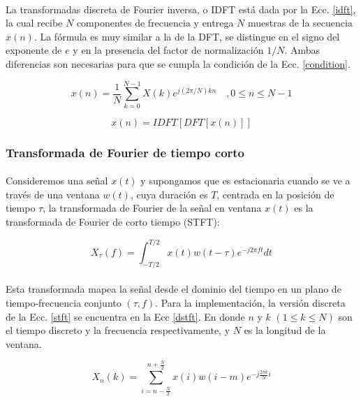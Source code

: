 \documentclass[a4paper,12pt]{article}
\begin{document}
\paragraph{}
La transformadas discreta de Fourier inversa, o IDFT está dada por la Ecc. \ref{idft}, la cual recibe $N$ componentes de frecuencia y entrega $N$ muestras de la secuencia $x(n)$. La fórmula es muy similar a la de la DFT, se distingue en el signo del exponente de $e$ y en la presencia del factor de normalización $1/N$. Ambas diferencias son necesarias para que se cumpla la condición de la Ecc. \ref{condition}.

\begin{equation}
\label{idft}
x(n)=\frac{1}{N}\sum_{k=0}^{N-1}X(k)e^{j(2\pi/N)kn} \quad ,0 \leq n \leq N-1
\end{equation}

\begin{equation}
\label{condition}
x(n) = IDFT[DFT[x(n)]]
\end{equation}

\subsubsection{Transformada de Fourier de tiempo corto}
\paragraph{}
Consideremos una señal $x(t)$ y supongamos que es estacionaria cuando se ve a través de una ventana $w(t)$, cuya duración es $T$, centrada en la posición de tiempo $\tau$, la transformada de Fourier de la señal en ventana $x(t)$ es la transformada de Fourier de corto tiempo \cite{yufeng} (STFT):

\begin{equation}
\label{stft}
X_{\tau}(f)=\int_{-T/2}^{T/2}x(t)w(t-\tau)e^{-j2{\pi}ft}dt
\end{equation}

\paragraph{}
Esta transformada mapea la señal desde el dominio del tiempo en un plano de tiempo-frecuencia conjunto $(\tau,f)$. Para la implementación, la versión discreta de la Ecc. \ref{stft} se encuentra en la Ecc \ref{dstft}. En donde $n$ y $k$ $(1{\leq}k{\leq}N)$ son el tiempo discreto y la frecuencia respectivamente, y $N$ es la longitud de la ventana.

\begin{equation}
\label{dstft}
X_{n}(k)=\sum_{i=n-\frac{N}{2}}^{n+\frac{N}{2}}x(i)w(i-m)e^{-j\frac{2{\pi}k}{N}i}
\end{equation}
\end{document}
